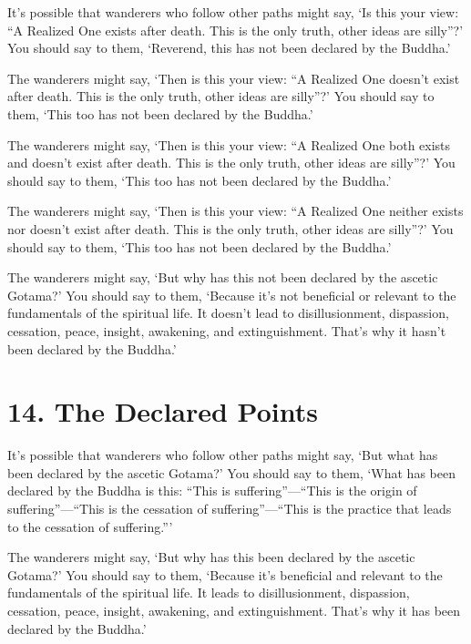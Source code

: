 \documentclass[12pt,openany]{book}%
\begin{document}
It’s possible that wanderers who follow other paths might say, ‘Is this your view: “A Realized One exists after death. This is the only truth, other ideas are silly”?’ You should say to them, ‘Reverend, this has not been declared by the Buddha.’ 

The wanderers might say, ‘Then is this your view: “A Realized One doesn’t exist after death. This is the only truth, other ideas are silly”?’ You should say to them, ‘This too has not been declared by the Buddha.’ 

The wanderers might say, ‘Then is this your view: “A Realized One both exists and doesn’t exist after death. This is the only truth, other ideas are silly”?’ You should say to them, ‘This too has not been declared by the Buddha.’ 

The wanderers might say, ‘Then is this your view: “A Realized One neither exists nor doesn’t exist after death. This is the only truth, other ideas are silly”?’ You should say to them, ‘This too has not been declared by the Buddha.’ 

The wanderers might say, ‘But why has this not been declared by the ascetic Gotama?’ You should say to them, ‘Because it’s not beneficial or relevant to the fundamentals of the spiritual life. It doesn’t lead to disillusionment, dispassion, cessation, peace, insight, awakening, and extinguishment. That’s why it hasn’t been declared by the Buddha.’ 

\section*{14. The Declared Points }

It’s possible that wanderers who follow other paths might say, ‘But what has been declared by the ascetic Gotama?’ You should say to them, ‘What has been declared by the Buddha is this: “This is suffering”—“This is the origin of suffering”—“This is the cessation of suffering”—“This is the practice that leads to the cessation of suffering.”’ 

The wanderers might say, ‘But why has this been declared by the ascetic Gotama?’ You should say to them, ‘Because it’s beneficial and relevant to the fundamentals of the spiritual life. It leads to disillusionment, dispassion, cessation, peace, insight, awakening, and extinguishment. That’s why it has been declared by the Buddha.’ 
\end{document}
